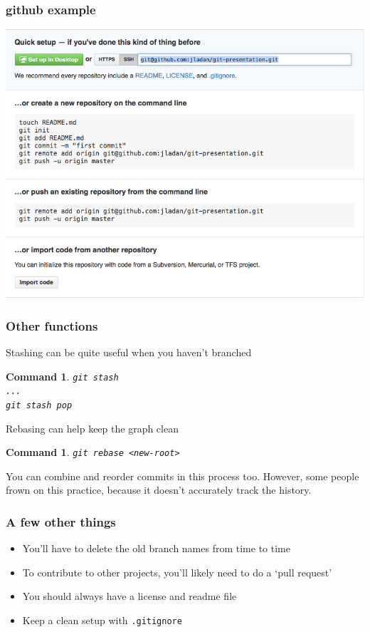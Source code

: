 \documentclass{beamer}
\newtheorem{command}[theorem]{Command}
\begin{document}
\begin{frame}
    \frametitle{github example}
    \includegraphics[height=.08\textheight]{figures/creating-on-github}
\end{frame}

\begin{frame}
    \frametitle{Other functions}
    Stashing can be quite useful when you haven't branched
    \begin{command}
        \texttt{git stash \\ ... \\ git stash pop}
    \end{command}

    \pause
    Rebasing can help keep the graph clean
    \begin{command}
        \texttt{git rebase <new-root>}
    \end{command}
    You can combine and reorder commits in this process too. However, some people frown on this practice, because it doesn't accurately track the history.
\end{frame}


\begin{frame}
    \frametitle{A few other things}
    \begin{itemize}
        \item You'll have to delete the old branch names from time to time
        \item To contribute to other projects, you'll likely need to do a `pull request'
        \item You should always have a license and readme file
        \item Keep a clean setup with \texttt{.gitignore}
    \end{itemize}
\end{frame}
\end{document}
